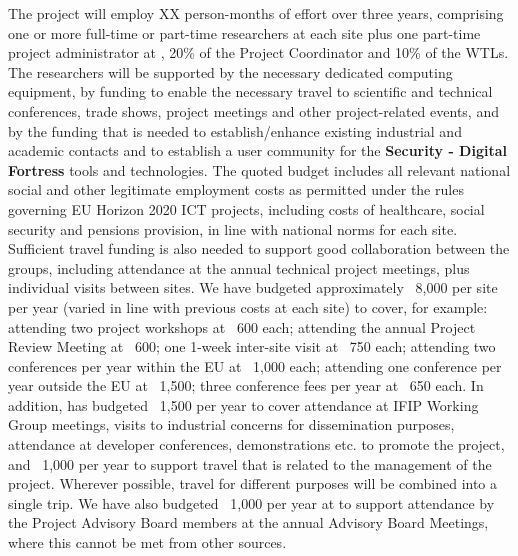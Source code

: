 \documentclass[a4paper,11pt]{article}
\newcommand{\project}[1]{\textbf{#1}\xspace}
\newcommand{\SECURITY}{\project{Security - Digital Fortress}}
\newcommand{\TheProject}{\SECURITY}
\begin{document}
The project will employ XX person-months of effort over three
years, comprising one or more full-time or part-time researchers at each site
plus one part-time project administrator at \SAshort{}, %
20\% of the Project Coordinator and 10\% of the WTLs. The researchers will be supported by
the necessary dedicated computing equipment,
by funding to enable the necessary travel to scientific and technical conferences, trade shows, 
project meetings and other project-related events, and by the funding that is needed to establish/enhance existing
industrial and academic contacts and to establish a user
community for the \TheProject{} tools and technologies.
%
The quoted budget includes all relevant national social and
other legitimate employment costs as permitted under the rules
governing EU Horizon 2020 ICT projects, including costs of
healthcare, social security and pensions provision, in line with national norms for each site.
%
Sufficient travel funding is also needed to support good
collaboration between the groups, including attendance at the
annual technical project meetings, plus individual visits between
sites. We have budgeted approximately \euros{}~8,000 per
site per year (varied in line with previous
costs at each site)  to cover, for example:
attending two project workshops at \euros{}~600 each;
attending the annual Project Review Meeting at \euros{}~600;
one 1-week inter-site visit at \euros{}~750 each;
attending two conferences per year within the EU at \euros{}~1,000 each;
attending one conference per year outside the EU at \euros{}~1,500;
three conference fees per year at \euros{}~650 each.
%
\noindent
In addition, \SAshort{} has budgeted \euros{}~1,500 per year to cover attendance at
IFIP Working Group meetings, visits to industrial concerns for dissemination purposes,
attendance at developer conferences, demonstrations etc. to promote the project,
and \euros~1,000 per year to support travel that is related to the management of the
project.
Wherever possible, travel for different purposes will be
combined into a single trip. We have also budgeted \euros~1,000
per year at \SAshort{} to support attendance by the Project Advisory Board members at
the annual Advisory Board Meetings, where this cannot be met from other sources.
\end{document}

